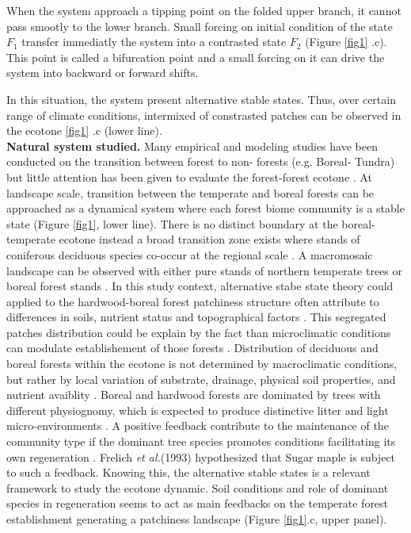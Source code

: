 When the system approach a tipping point on the folded upper branch, it cannot
pass smootly to the lower branch. Small forcing on initial condition of the
state $F_1$ transfer immediatly the system into a contrasted state $F_2$
(Figure \ref{fig1} .c). This point is called a bifurcation point and a small
forcing on it can drive the system into backward or forward shifts.  

In this
situation, the system present alternative stable states. Thus, over certain range of
climate conditions, intermixed of constrasted patches can be observed in the
ecotone \ref{fig1} .c (lower line).\\

\textbf{Natural system studied.} Many empirical and modeling studies have been
conducted on the transition between forest to non- forests (e.g. Boreal-
Tundra) \cite{Scheffer2012,Scheffer2001,Hirota2011,Messaoud2007} but little
attention has been given to evaluate the forest-forest ecotone
\cite{Goldblum2010,Graignic2013,Messaoud2007}. At landscape scale, transition
between  the temperate and boreal forests can be approached as a dynamical
system where each forest biome community is a stable state (Figure \ref{fig1},
lower line). There is no distinct boundary at the boreal-temperate ecotone
instead a broad transition zone exists where stands of coniferous deciduous
species co-occur at the regional scale \cite{Goldblum2010,Fisichelli2013}. A
macromosaic landscape can be observed with either pure stands of northern
temperate trees or boreal forest stands \cite{Goldblum2010,Fisichelli2013}. In
this study context, alternative stabe state theory could applied to the
hardwood-boreal forest patchiness structure often attribute to differences in
soils, nutrient status and topographical factors \cite{Society2014}. This
segregated patches distribution could be explain by the fact than
microclimatic conditions can modulate establishement of those forests
\cite{DeFrenne2013}. Distribution of deciduous and boreal forests within the
ecotone is not determined by macroclimatic conditions, but rather by local
variation of substrate, drainage, physical soil properties, and nutrient
avaiblity \cite{Goldblum2010,Society2014}. Boreal and hardwood forests are
dominated by trees with different physiognomy, which is expected to produce
distinctive litter and light micro-environments \cite{Barras1998}.  A positive
feedback contribute to the maintenance of the community type if the dominant
tree species promotes conditions facilitating its own regeneration
\cite{Barras1998}. Frelich \textit{et al.}(1993) \cite{Society2014}
hypothesized that Sugar maple is subject to such a feedback.  Knowing this,
the alternative stable states is a relevant framework to study the ecotone
dynamic. Soil conditions and role of dominant species in regeneration seems to
act as main feedbacks on the temperate forest establishment generating a
patchiness landscape (Figure \ref{fig1}.c, upper panel).

